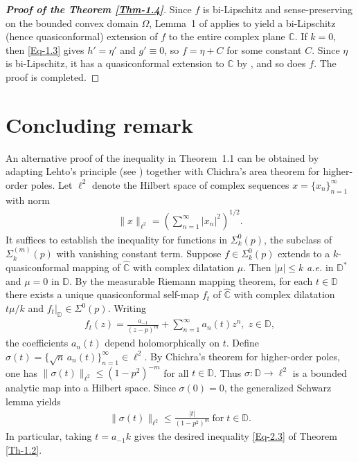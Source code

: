 \documentclass[a4paper,12pt]{amsart}
\theoremstyle{plain}
\theoremstyle{definition}
\begin{document}
\begin{proof}[\bf Proof of the Theorem \ref{Thm-1.4}]
	Since $f$ is bi-Lipschitz and sense-preserving on the bounded convex domain $\Omega$, Lemma~1 of \cite{Bhowmik-Satapati-Complex Sgn-2024} applies to yield a bi-Lipschitz (hence quasiconformal) extension of $f$ to the entire complex plane $\mathbb{C}$. If $k=0$, then \eqref{Eq-1.3} gives $h'=\eta'$ and $g'\equiv 0$, so $f=\eta+C$ for some constant $C$. Since $\eta$ is bi-Lipschitz, it has a quasiconformal extension to $\mathbb{C}$ by \cite[Lemma 1]{Bhowmik-Satapati-Complex Sgn-2024}, and so does $f$. The proof is completed.
\end{proof}
\section{\bf Concluding remark}\label{Sec-3}
	An alternative proof of the inequality in Theorem~1.1 can be obtained by adapting Lehto’s principle (see \cite[II.3.3]{Lehto-1987}) together with Chichra’s area theorem \cite{Chichra1969} for higher-order poles. 
	Let $\ell^{2}$ denote the Hilbert space of complex sequences 
	$x=\{x_{n}\}_{n=1}^{\infty}$ with norm
	\begin{align*}
		\|x\|_{\ell^{2}}
		=\left(\sum_{n=1}^{\infty} |x_{n}|^{2}\right)^{1/2}.
	\end{align*}
	It suffices to establish the inequality for functions in 
	$\Sigma^{0}_{k}(p)$, the subclass of $\Sigma^{(m)}_{k}(p)$ with vanishing 
	constant term. Suppose $f\in \Sigma^{0}_{k}(p)$ extends to a 
	$k$-quasiconformal mapping of $\widehat{\mathbb{C}}$ with complex 
	dilatation $\mu$. Then $|\mu|\leq k$ \textit{a.e.} in $\mathbb{D}^{*}$ and $\mu=0$ 
	in $\mathbb{D}$. By the measurable Riemann mapping theorem, for each 
	$t\in\mathbb{D}$ there exists a unique quasiconformal self-map $f_{t}$ of 	$\widehat{\mathbb{C}}$ with complex dilatation $t\mu/k$ and 
	$f_{t}|_{\mathbb{D}}\in \Sigma^{0}(p)$. Writing
	\begin{align*}
		f_{t}(z)=\frac{a_{-1}}{(z-p)^{m}}+\sum_{n=1}^{\infty} a_{n}(t) z^{n},\; z\in\mathbb{D},
	\end{align*}
	the coefficients $a_{n}(t)$ depend holomorphically on $t$. 
	Define $\sigma(t)=\{\sqrt{n}\,a_{n}(t)\}_{n=1}^{\infty}\in \ell^{2}$. 
	By Chichra’s theorem for higher-order poles, one has 
	$\|\sigma(t)\|_{\ell^{2}}\leq (1-p^{2})^{-m}$ for all $t\in \mathbb{D}$. 
	Thus $\sigma:\mathbb{D}\to \ell^{2}$ is a bounded analytic map into a 
	Hilbert space. Since $\sigma(0)=0$, the generalized Schwarz lemma yields
	\begin{align*}
		\|\sigma(t)\|_{\ell^{2}}\leq \frac{|t|}{(1-p^{2})^{m}}\ \mbox{for}\; t\in\mathbb{D}.
	\end{align*}
	In particular, taking $t=a_{-1}k$ gives the desired inequality \eqref{Eq-2.3} of Theorem \ref{Th-1.2}. \vspace{5mm}
\end{document}
